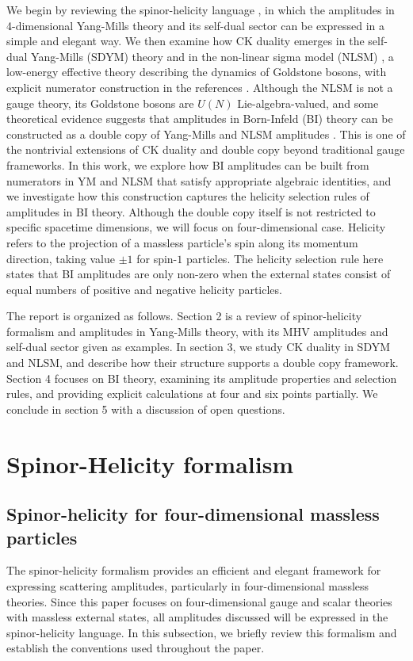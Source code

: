 \documentclass[a4paper,11pt]{article}
\begin{document}
We begin by reviewing the spinor-helicity language \cite{Dixon:1996wi,Elvang:2015rqa}, in which the amplitudes in 4-dimensional Yang-Mills theory and its self-dual sector can be expressed in a simple and elegant way. 
We then examine how CK duality emerges in the self-dual Yang-Mills (SDYM) theory \cite{Monteiro:2011pc,Boels:2013bi,He:2015wgf} and in the non-linear sigma model (NLSM) \cite{Du:2016tbc,Carrasco:2016ldy,Carrasco:2016ygv,Cheung:2016prv}, 
a low-energy effective theory describing the dynamics of Goldstone bosons, with explicit numerator construction in the references \cite{Du:2016tbc,Carrasco:2016ldy,Carrasco:2016ygv,Cheung:2016prv}.
Although the NLSM is not a gauge theory, its Goldstone bosons are $U(N)$ Lie-algebra-valued, and some theoretical evidence suggests that 
amplitudes in Born-Infeld (BI) theory \cite{Born:1934gh,Tseytlin:1999dj} can be constructed as a double copy of Yang-Mills and NLSM amplitudes \cite{Cachazo:2014xea,Cachazo:2015ksa}.
This is one of the nontrivial extensions of CK duality and double copy beyond traditional gauge frameworks. 
In this work, we explore how BI amplitudes can be built from numerators in YM and NLSM that satisfy appropriate algebraic identities, 
and we investigate how this construction captures the helicity selection rules of amplitudes in BI theory. 
Although the double copy itself is not restricted to specific spacetime dimensions, we will focus on four-dimensional case.
Helicity refers to the projection of a massless particle's spin along its momentum direction, taking value $\pm 1$ for spin-$1$ particles. 
The helicity selection rule here states that BI amplitudes are only non-zero when the external states consist of equal numbers of positive and negative helicity particles.\par
The report is organized as follows. Section 2 is a review of spinor-helicity formalism and amplitudes in Yang-Mills theory, with its MHV amplitudes and self-dual sector given as examples. 
In section 3, we study CK duality in SDYM and NLSM, and describe how their structure supports a double copy framework. Section 4 focuses on BI theory, examining its amplitude properties and selection rules, 
and providing explicit calculations at four and six points partially. We conclude in section 5 with a discussion of open questions.
\section{Spinor-Helicity formalism}
\subsection{Spinor-helicity for four-dimensional massless particles}
The spinor-helicity formalism provides an efficient and elegant framework for expressing scattering amplitudes, 
particularly in four-dimensional massless theories. 
Since this paper focuses on four-dimensional gauge and scalar theories with massless external states, 
all amplitudes discussed will be expressed in the spinor-helicity language. In this subsection, 
we briefly review this formalism and establish the conventions used throughout the paper.\par
\end{document}
